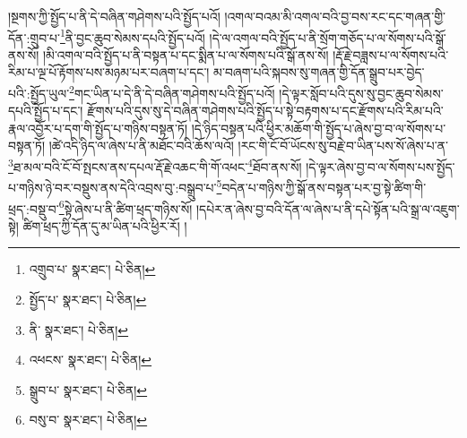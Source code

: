 །སྔགས་ཀྱི་སྤྱོད་པ་ནི་དེ་བཞིན་གཤེགས་པའི་སྤྱོད་པའོ། །འགལ་བའམ་མི་འགལ་བའི་བྱ་བས་རང་དང་གཞན་གྱི་དོན་:གྲུབ་པ་\footnote{འགྲུབ་པ་  སྣར་ཐང་།  པེ་ཅིན། }ནི་བྱང་ཆུབ་སེམས་དཔའི་སྤྱོད་པའོ། །དེ་ལ་འགལ་བའི་སྤྱོད་པ་ནི་སྲོག་གཅོད་པ་ལ་སོགས་པའི་སྒོ་ནས་སོ། །མི་འགལ་བའི་སྤྱོད་པ་ནི་བསྟན་པ་དང་སྨིན་པ་ལ་སོགས་པའི་སྒོ་ནས་སོ། །རྡོ་རྗེ་བཟླས་པ་ལ་སོགས་པའི་རིམ་པ་ལྔ་པོ་རྟོགས་པས་མཉམ་པར་བཞག་པ་དང་། མ་བཞག་པའི་སྐབས་སུ་གཞན་གྱི་དོན་སྒྲུབ་པར་བྱེད་པའི་:སྤྱོད་ཡུལ་\footnote{སྤྱོད་པ་  སྣར་ཐང་།  པེ་ཅིན། }གང་ཡིན་པ་དེ་ནི་དེ་བཞིན་གཤེགས་པའི་སྤྱོད་པའོ། །དེ་ལྟར་སློབ་པའི་དུས་སུ་བྱང་ཆུབ་སེམས་དཔའི་སྤྱོད་པ་དང་། རྫོགས་པའི་དུས་སུ་དེ་བཞིན་གཤེགས་པའི་སྤྱོད་པ་སྟེ་བརྟགས་པ་དང་རྫོགས་པའི་རིམ་པའི་རྣལ་འབྱོར་པ་དག་གི་སྤྱོད་པ་གཉིས་བསྟན་ཏོ། །དེ་ཉིད་བསྟན་པའི་ཕྱིར་མཆོག་གི་སྤྱོད་པ་ཞེས་བྱ་བ་ལ་སོགས་པ་བསྟན་ཏོ། །ཚེ་འདི་ཉིད་ལ་ཞེས་པ་ནི་མཐོང་བའི་ཆོས་ལའོ། །རང་གི་ངོ་བོ་ཡོངས་སུ་བརྗེ་བ་ཡིན་པས་སོ་ཞེས་པ་ན་\footnote{ནི་  སྣར་ཐང་།  པེ་ཅིན། }ཐ་མལ་བའི་ངོ་བོ་སྤངས་ནས་དཔལ་རྡོ་རྗེ་འཆང་གི་གོ་འཕང་\footnote{འཕངས་  སྣར་ཐང་།  པེ་ཅིན། }ཐོབ་ནས་སོ། །དེ་ལྟར་ཞེས་བྱ་བ་ལ་སོགས་པས་སྤྱོད་པ་གཉིས་ཉེ་བར་བསྡུས་ནས་དེའི་འབྲས་བུ་:བསྒྲུབ་པ་\footnote{སྒྲུབ་པ་  སྣར་ཐང་།  པེ་ཅིན། }བདེན་པ་གཉིས་ཀྱི་སྒོ་ནས་བསྟན་པར་བྱ་སྟེ་ཚིག་གི་ཕྲད་:བསྡུ་བ་\footnote{བསུ་བ་  སྣར་ཐང་།  པེ་ཅིན། }སྟེ་ཞེས་པ་ནི་ཚིག་ཕྲད་གཉིས་སོ། །དཔེར་ན་ཞེས་བྱ་བའི་དོན་ལ་ཞེས་པ་ནི་དཔེ་སྟོན་པའི་སྒྲ་ལ་འཇུག་སྟེ། ཚིག་ཕྲད་ཀྱི་དོན་དུ་མ་ཡིན་པའི་ཕྱིར་རོ། །

